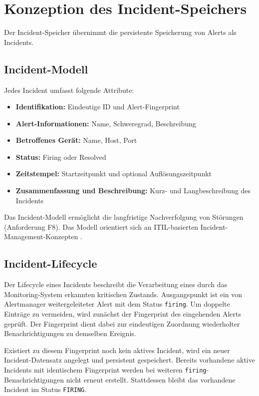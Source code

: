 \section{Konzeption des Incident-Speichers}
\label{sec:konzeption-incident-speicher}

Der Incident-Speicher übernimmt die persistente Speicherung von Alerts als Incidents.

\subsection{Incident-Modell}
\label{subsec:incident-modell}

Jedes Incident umfasst folgende Attribute:

\begin{itemize}
    \item \textbf{Identifikation:} Eindeutige ID und Alert-Fingerprint
    \item \textbf{Alert-Informationen:} Name, Schweregrad, Beschreibung
    \item \textbf{Betroffenes Gerät:} Name, Host, Port
    \item \textbf{Status:} Firing oder Resolved
    \item \textbf{Zeitstempel:} Startzeitpunkt und optional Auflösungszeitpunkt
    \item \textbf{Zusammenfassung und Beschreibung:} Kurz- und Langbeschreibung des Incidents
\end{itemize}

Das Incident-Modell ermöglicht die langfristige Nachverfolgung von Störungen (Anforderung F8). Das Modell orientiert sich an ITIL-basierten Incident-Management-Konzepten \cite{incident-management-itil}.

\subsection{Incident-Lifecycle}
\label{subsec:incident-lifecycle}

Der Lifecycle eines Incidents beschreibt die Verarbeitung eines durch das
Monitoring-System erkannten kritischen Zustands. Ausgangspunkt ist ein von
Alertmanager weitergeleiteter Alert mit dem Status \texttt{firing}. Um
doppelte Einträge zu vermeiden, wird zunächst der Fingerprint des eingehenden
Alerts geprüft. Der Fingerprint dient dabei zur eindeutigen Zuordnung
wiederholter Benachrichtigungen zu demselben Ereignis.

Existiert zu diesem Fingerprint noch kein aktives Incident, wird ein neuer
Incident-Datensatz angelegt und persistent gespeichert. Bereits vorhandene
aktive Incidents mit identischem Fingerprint werden bei weiteren
\texttt{firing}-Benachrichtigungen nicht erneut erstellt. Stattdessen bleibt
das vorhandene Incident im Status \texttt{FIRING}.

